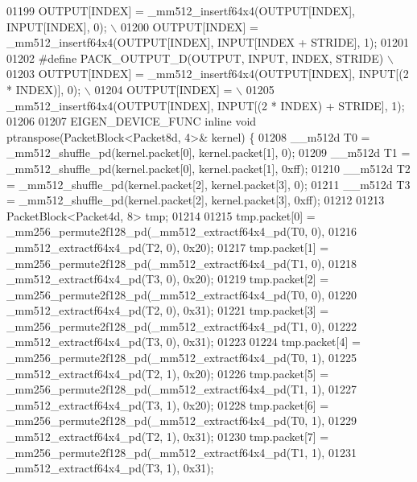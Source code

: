 \begin{DoxyCode}
01199 \textcolor{preprocessor}{  OUTPUT[INDEX] = \_mm512\_insertf64x4(OUTPUT[INDEX], INPUT[INDEX], 0); \(\backslash\)}
01200 \textcolor{preprocessor}{  OUTPUT[INDEX] = \_mm512\_insertf64x4(OUTPUT[INDEX], INPUT[INDEX + STRIDE], 1);}
01201 
01202 \textcolor{preprocessor}{#define PACK\_OUTPUT\_D(OUTPUT, INPUT, INDEX, STRIDE)                         \(\backslash\)}
01203 \textcolor{preprocessor}{  OUTPUT[INDEX] = \_mm512\_insertf64x4(OUTPUT[INDEX], INPUT[(2 * INDEX)], 0); \(\backslash\)}
01204 \textcolor{preprocessor}{  OUTPUT[INDEX] =                                                           \(\backslash\)}
01205 \textcolor{preprocessor}{      \_mm512\_insertf64x4(OUTPUT[INDEX], INPUT[(2 * INDEX) + STRIDE], 1);}
01206 
01207 EIGEN\_DEVICE\_FUNC \textcolor{keyword}{inline} \textcolor{keywordtype}{void} ptranspose(PacketBlock<Packet8d, 4>& kernel) \{
01208   \_\_m512d T0 = \_mm512\_shuffle\_pd(kernel.packet[0], kernel.packet[1], 0);
01209   \_\_m512d T1 = \_mm512\_shuffle\_pd(kernel.packet[0], kernel.packet[1], 0xff);
01210   \_\_m512d T2 = \_mm512\_shuffle\_pd(kernel.packet[2], kernel.packet[3], 0);
01211   \_\_m512d T3 = \_mm512\_shuffle\_pd(kernel.packet[2], kernel.packet[3], 0xff);
01212 
01213   PacketBlock<Packet4d, 8> tmp;
01214 
01215   tmp.packet[0] = \_mm256\_permute2f128\_pd(\_mm512\_extractf64x4\_pd(T0, 0),
01216                                          \_mm512\_extractf64x4\_pd(T2, 0), 0x20);
01217   tmp.packet[1] = \_mm256\_permute2f128\_pd(\_mm512\_extractf64x4\_pd(T1, 0),
01218                                          \_mm512\_extractf64x4\_pd(T3, 0), 0x20);
01219   tmp.packet[2] = \_mm256\_permute2f128\_pd(\_mm512\_extractf64x4\_pd(T0, 0),
01220                                          \_mm512\_extractf64x4\_pd(T2, 0), 0x31);
01221   tmp.packet[3] = \_mm256\_permute2f128\_pd(\_mm512\_extractf64x4\_pd(T1, 0),
01222                                          \_mm512\_extractf64x4\_pd(T3, 0), 0x31);
01223 
01224   tmp.packet[4] = \_mm256\_permute2f128\_pd(\_mm512\_extractf64x4\_pd(T0, 1),
01225                                          \_mm512\_extractf64x4\_pd(T2, 1), 0x20);
01226   tmp.packet[5] = \_mm256\_permute2f128\_pd(\_mm512\_extractf64x4\_pd(T1, 1),
01227                                          \_mm512\_extractf64x4\_pd(T3, 1), 0x20);
01228   tmp.packet[6] = \_mm256\_permute2f128\_pd(\_mm512\_extractf64x4\_pd(T0, 1),
01229                                          \_mm512\_extractf64x4\_pd(T2, 1), 0x31);
01230   tmp.packet[7] = \_mm256\_permute2f128\_pd(\_mm512\_extractf64x4\_pd(T1, 1),
01231                                          \_mm512\_extractf64x4\_pd(T3, 1), 0x31);

\end{DoxyCode}
